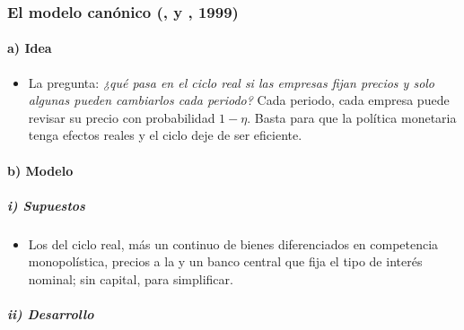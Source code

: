 \documentclass[11pt]{article}
\begin{document}
\subsubsection{El modelo canónico (,  y , 1999)}\label{sec:nek-modelo}

\paragraph{a) Idea}

\begin{itemize}
\item La pregunta: \emph{¿qué pasa en el ciclo real si las empresas fijan precios y solo algunas pueden cambiarlos cada periodo?} Cada periodo, cada empresa puede revisar su precio con probabilidad $1-\eta$\nocite{Calvo1983Staggered}. Basta para que la política monetaria tenga efectos reales y el ciclo deje de ser eficiente.
\end{itemize}

\paragraph{b) Modelo}

\subparagraph{i) Supuestos}

\begin{itemize}
\item Los del ciclo real, más un continuo de bienes diferenciados en competencia monopolística, precios a la  y un banco central que fija el tipo de interés nominal; sin capital, para simplificar.
\end{itemize}

\subparagraph{ii) Desarrollo}
\end{document}
